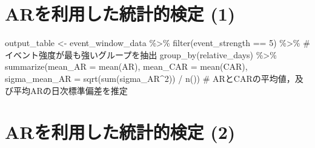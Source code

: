 \documentclass[
  letterpaper,
  DIV=11,
  numbers=noendperiod]{scrreprt}
\newenvironment{Shaded}{\begin{snugshade}}{\end{snugshade}}
\newcommand{\AttributeTok}[1]{\textcolor[rgb]{0.40,0.45,0.13}{#1}}
\newcommand{\CommentTok}[1]{\textcolor[rgb]{0.37,0.37,0.37}{#1}}
\newcommand{\DecValTok}[1]{\textcolor[rgb]{0.68,0.00,0.00}{#1}}
\newcommand{\FunctionTok}[1]{\textcolor[rgb]{0.28,0.35,0.67}{#1}}
\newcommand{\NormalTok}[1]{\textcolor[rgb]{0.00,0.23,0.31}{#1}}
\newcommand{\OtherTok}[1]{\textcolor[rgb]{0.00,0.23,0.31}{#1}}
\newcommand{\SpecialCharTok}[1]{\textcolor[rgb]{0.37,0.37,0.37}{#1}}
\begin{document}
\section{ARを利用した統計的検定
(1)}\label{arux3092ux5229ux7528ux3057ux305fux7d71ux8a08ux7684ux691cux5b9a-1}

\begin{Shaded}
\begin{Highlighting}[]
\NormalTok{output\_table }\OtherTok{\textless{}{-}}\NormalTok{ event\_window\_data }\SpecialCharTok{\%\textgreater{}\%}
  \FunctionTok{filter}\NormalTok{(event\_strength }\SpecialCharTok{==} \DecValTok{5}\NormalTok{) }\SpecialCharTok{\%\textgreater{}\%} \CommentTok{\# イベント強度が最も強いグループを抽出}
  \FunctionTok{group\_by}\NormalTok{(relative\_days) }\SpecialCharTok{\%\textgreater{}\%}
  \FunctionTok{summarize}\NormalTok{(}\AttributeTok{mean\_AR =} \FunctionTok{mean}\NormalTok{(AR), }
            \AttributeTok{mean\_CAR =} \FunctionTok{mean}\NormalTok{(CAR), }
            \AttributeTok{sigma\_mean\_AR =} \FunctionTok{sqrt}\NormalTok{(}\FunctionTok{sum}\NormalTok{(sigma\_AR}\SpecialCharTok{\^{}}\DecValTok{2}\NormalTok{)) }\SpecialCharTok{/} \FunctionTok{n}\NormalTok{()) }\CommentTok{\# ARとCARの平均値，及び平均ARの日次標準偏差を推定}
\end{Highlighting}
\end{Shaded}

\section{ARを利用した統計的検定
(2)}\label{arux3092ux5229ux7528ux3057ux305fux7d71ux8a08ux7684ux691cux5b9a-2}
\end{document}
